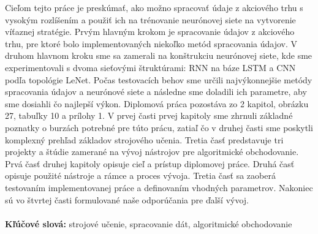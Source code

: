 \documentclass[a4paper,oneside,onecolumn,12pt]{book}
\begin{document}
\label{sec:abstrakt}
\thispagestyle{empty}
Cieľom tejto práce je preskúmať, ako možno spracovať údaje z akciového trhu s vysokým rozlíšením a použiť ich na trénovanie neurónovej siete na vytvorenie víťaznej stratégie. Prvým hlavným krokom je spracovanie údajov z akciového trhu, pre ktoré bolo implementovaných niekoľko metód spracovania údajov. V druhom hlavnom kroku sme sa zamerali na konštrukciu neurónovej siete, kde sme experimentovali s dvoma sieťovými štruktúrami: RNN na báze LSTM a CNN podľa topológie LeNet. Počas testovacích behov sme určili najvýkonnejšie metódy spracovania údajov a neurónové siete a následne sme doladili ich parametre, aby sme dosiahli čo najlepší výkon. Diplomová práca pozostáva zo 2 kapitol, obrázku 27, tabuľky 10 a prílohy 1. V prvej časti prvej kapitoly sme zhrnuli základné poznatky o burzách potrebné pre túto prácu, zatiaľ čo v druhej časti sme poskytli komplexný prehľad základov strojového učenia. Tretia časť predstavuje tri projekty a štúdie zamerané na vývoj nástrojov pre algoritmické obchodovanie. Prvá časť druhej kapitoly opisuje cieľ a prístup diplomovej práce. Druhá časť opisuje použité nástroje a rámce a proces vývoja. Tretia časť sa zaoberá testovaním implementovanej práce a definovaním vhodných parametrov. Nakoniec sú vo štvrtej časti formulované naše odporúčania pre ďalší vývoj.
\\\\
\textbf{Kľúčové slová:} strojové učenie, spracovanie dát, algoritmické obchodovanie
\pagebreak
\end{document}
